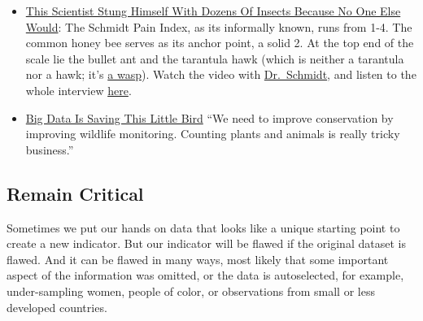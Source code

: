 \documentclass[
  a4paper,
  openany, a4paper, oneside]{book}
\providecommand{\tightlist}{%
  \setlength{\itemsep}{0pt}\setlength{\parskip}{0pt}}
\begin{document}
\begin{itemize}
\tightlist
\item
  \href{https://fivethirtyeight.com/features/this-scientist-stung-himself-with-dozens-of-insects-because-no-one-else-would/}{This Scientist Stung Himself With Dozens Of Insects Because No One Else Would}: The Schmidt Pain Index, as its informally known, runs from 1-4. The common honey bee serves as its anchor point, a solid 2. At the top end of the scale lie the bullet ant and the tarantula hawk (which is neither a tarantula nor a hawk; it's \href{https://www.wired.com/2015/07/absurd-creature-of-the-week-tarantula-hawk/}{a wasp}). Watch the video with \href{https://youtu.be/i0LjT-qkUes}{Dr.~Schmidt}, and listen to the whole interview \href{https://podcasts.apple.com/us/podcast/48-the-schmidt-sting-pain-index/id1011406983?i=1000391467968}{here}.
\item
  \href{https://fivethirtyeight.com/features/big-data-is-saving-this-little-bird/}{Big Data Is Saving This Little Bird} ``We need to improve conservation by improving wildlife monitoring. Counting plants and animals is really tricky business.''
\end{itemize}

\hypertarget{critical-attitude}{%
\subsection{Remain Critical}\label{critical-attitude}}

Sometimes we put our hands on data that looks like a unique starting point to create a new indicator. But our indicator will be flawed if the original dataset is flawed. And it can be flawed in many ways, most likely that some important aspect of the information was omitted, or the data is autoselected, for example, under-sampling women, people of color, or observations from small or less developed countries.
\end{document}
